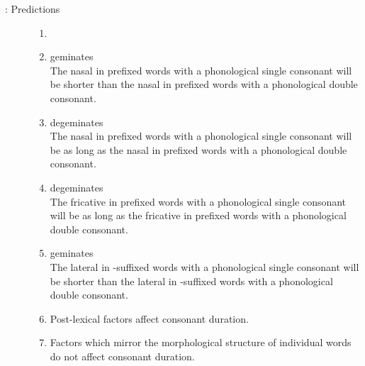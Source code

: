 \newpage
\begin{description}\item[: Predictions]
\begin{enumerate}[leftmargin=*]
	\item[]
	\item {} geminates \\
	The nasal in prefixed words with a phonological single consonant will be shorter than the nasal in prefixed words with a phonological double consonant. %
	
	\item {} degeminates \\
	The nasal in prefixed words with a phonological single consonant will be as long as the nasal in  prefixed words with a phonological double consonant.%
	
	
	
	\item {} degeminates \\
	The fricative in prefixed words with a phonological single consonant will be as long as the fricative in prefixed words with a phonological double consonant. %
	
	
	
	\item {} geminates \\
	The lateral in -suffixed words with a phonological single consonant will be shorter than the lateral in -suffixed words with a phonological double consonant.%
	
	\item Post-lexical factors affect consonant duration.
	
	\item Factors which mirror the morphological structure of individual words do not affect consonant duration.
	
\end{enumerate}
\end{description}

